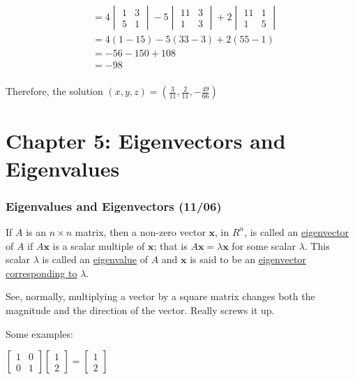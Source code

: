 \documentclass[
  letterpaper,
  DIV=11,
  numbers=noendperiod]{scrartcl}
\begin{document}
\begin{align*}
&= 4\begin{vmatrix}1 & 3 \\ 5 & 1\end{vmatrix}-5\begin{vmatrix}11 & 3 \\ 1 & 3\end{vmatrix}+2\begin{vmatrix}11 & 1 \\ 1 & 5\end{vmatrix} \\
&= 4(1-15)-5(33-3)+2(55-1) \\
&= -56-150+108 \\
&= -98 \\
\end{align*}

Therefore, the solution
\((x, y, z) = (\frac{3}{11}, \frac{2}{11}, -\frac{49}{66})\)

\newpage{}

\hypertarget{chapter-5-eigenvectors-and-eigenvalues}{%
\section{Chapter 5: Eigenvectors and
Eigenvalues}\label{chapter-5-eigenvectors-and-eigenvalues}}

\hypertarget{eigenvalues-and-eigenvectors-1106}{%
\subsubsection{Eigenvalues and Eigenvectors
(11/06)}\label{eigenvalues-and-eigenvectors-1106}}

If \(A\) is an \(n \times n\) matrix, then a non-zero vector
\(\symbf{x}\), in \(R^n\), is called an \ul{eigenvector} of \(A\) if
\(A\symbf{x}\) is a scalar multiple of \(\symbf{x}\); that is
\(A\symbf{x} = \lambda\symbf{x}\) for some scalar \(\lambda\). This
scalar \(\lambda\) is called an \ul{eigenvalue} of \(A\) and
\(\symbf{x}\) is said to be an \ul{eigenvector corresponding to}
\(\lambda\).

See, normally, multiplying a vector by a square matrix changes both the
magnitude and the direction of the vector. Really screws it up.

Some examples:

\(\begin{bmatrix}1 & 0 \\ 0 & 1\end{bmatrix}\begin{bmatrix}1 \\ 2\end{bmatrix}=\begin{bmatrix}1 \\ 2\end{bmatrix}\)
\end{document}
